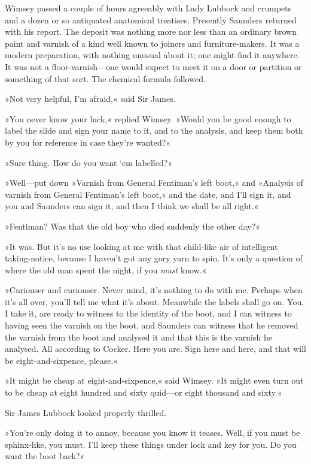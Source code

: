 Wimsey passed a couple of hours agreeably with Lady Lubbock and crumpets and a dozen or so antiquated anatomical treatises. Presently Saunders returned with his report. The deposit was nothing more nor less than an ordinary brown paint and varnish of a kind well known to joiners and furniture-makers. It was a modern preparation, with nothing unusual about it; one might find it anywhere. It was not a floor-varnish—one would expect to meet it on a door or partition or something of that sort. The chemical formula followed.

»Not very helpful, I'm afraid,« said Sir James.

»You never know your luck,« replied Wimsey. »Would you be good enough to label the slide and sign your name to it, and to the analysis, and keep them both by you for reference in case they're wanted?«

»Sure thing. How do you want `em labelled?«

»Well—put down »Varnish from General Fentiman's left boot,« and »Analysis of varnish from General Fentiman's left boot,« and the date, and I'll sign it, and you and Saunders can sign it, and then I think we shall be all right.«

»Fentiman? Was that the old boy who died suddenly the other day?«

»It was. But it's no use looking at me with that child-like air of intelligent taking-notice, because I haven't got any gory yarn to spin. It's only a question of where the old man spent the night, if you \textit{must} know.«

»Curiouser and curiouser. Never mind, it's nothing to do with me. Perhaps when it's all over, you'll tell me what it's about. Meanwhile the labels shall go on. You, I take it, are ready to witness to the identity of the boot, and I can witness to having seen the varnish on the boot, and Saunders can witness that he removed the varnish from the boot and analysed it and that this is the varnish he analysed. All according to Cocker. Here you are. Sign here and here, and that will be eight-and-sixpence, please.«

»It might be cheap at eight-and-sixpence,« said Wimsey. »It might even turn out to be cheap at eight hundred and sixty quid—or eight thousand and sixty.«

Sir James Lubbock looked properly thrilled.

»You're only doing it to annoy, because you know it teases. Well, if you must be sphinx-like, you must. I'll keep these things under lock and key for you. Do you want the boot back?«

